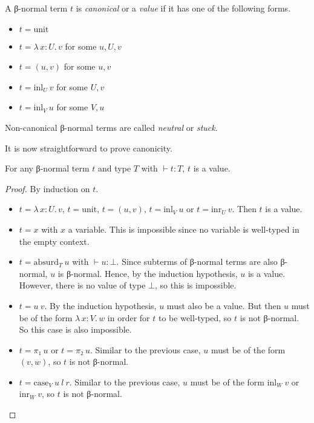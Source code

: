 \documentclass{article}
\theoremstyle{definition}
\newcommand{\Lam}[2]{λ\,#1.\, #2}
\newcommand{\unit}{\mathrm{unit}}
\newcommand{\absurd}{\mathrm{absurd}}
\newcommand{\inl}{\ensuremath{\mathrm{inl}}}
\newcommand{\inr}{\ensuremath{\mathrm{inr}}}
\newcommand{\case}{\mathrm{case}}
\begin{document}
\begin{definition}[Values]
  A β-normal term $t$ is \emph{canonical} or a \emph{value} if it has one of the following forms.
  \begin{itemize}
    \item $t = \unit$
    \item $t = \Lam{x : U}{v}$ for some $u, U, v$
    \item $t = (u, v)$ for some $u, v$
    \item $t = \inl_{U}~v$ for some $U, v$
    \item $t = \inl_{V}~u$ for some $V, u$
  \end{itemize}
  Non-canonical β-normal terms are called \emph{neutral} or \emph{stuck}.
\end{definition}

It is now straightforward to prove canonicity.

\begin{theorem}[Canonicity]
  For any β-normal term $t$ and type $T$ with $⊢ t : T$, $t$ is a value.
\end{theorem}

\begin{proof}
  By induction on $t$.
  \begin{itemize}
    \item $t = \Lam{x : U}{v}$, $t = \unit$, $t = (u, v)$, $t = \inl_{V}~u$ or $t = \inr_{U}~v$.
          Then $t$ is a value.
    \item $t = x$ with $x$ a variable.
          This is impossible since no variable is well-typed in the empty context.
    \item $t = \absurd_{T}~u$ with $⊢ u : ⊥$.
          Since subterms of β-normal terms are also β-normal, $u$ is β-normal.
          Hence, by the induction hypothesis, $u$ is a value.
          However, there is no value of type $⊥$, so this is impossible.
    \item $t = u~v$.
          By the induction hypothesis, $u$ must also be a value.
          But then $u$ must be of the form $\Lam{x : V}{w}$ in order for $t$ to be well-typed, so $t$ is not β-normal.
          So this case is also impossible.
    \item $t = π₁~u$ or $t = π₂~u$.
          Similar to the previous case, $u$ must be of the form $(v, w)$, so $t$ is not β-normal.
    \item $t = \case_{V}~u~l~r$.
          Similar to the previous case, $u$ must be of the form $\inl_{W}~v$ or $\inr_{W}~v$, so $t$ is not β-normal.
  \end{itemize}
\end{proof}
\end{document}
